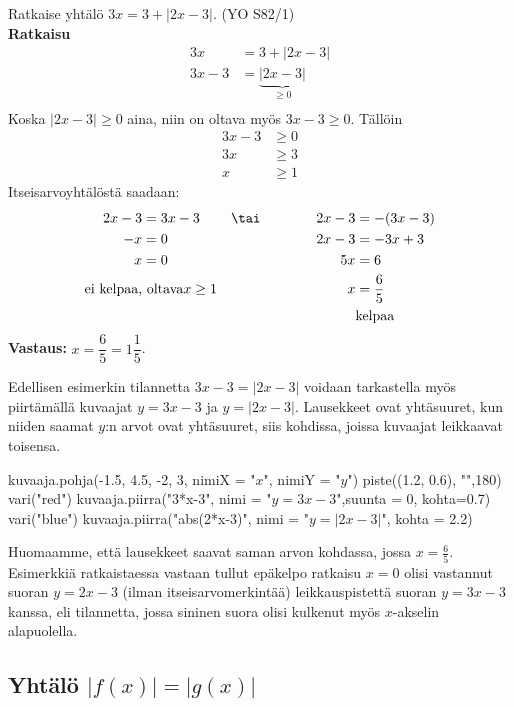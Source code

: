 \begin{esimerkki}
Ratkaise yhtälö $3x=3+|2x-3|$. (YO S82/1)\\
\textbf{Ratkaisu}\\
\begin{align*}
	3x&=3+|2x-3|  \\
	3x-3&=\underbrace{|2x-3|}_{\geq0}  \\
\end{align*}
Koska $|2x-3|\geq0$ aina, niin on oltava myös $3x-3\geq0$. Tällöin
\begin{align*}
	3x-3&\geq0 \\
	3x&\geq3 \\
	x&\geq1
\end{align*}
Itseisarvoyhtälöstä saadaan:
\begin{align*}
	2x-3&=3x-3   &\tai  \qquad \qquad 2x-3&=-(3x-3) \\
	-x&=0        &\ \                  2x-3&=-3x+3 \\
	x&=0         &\ \                  5x&=6 \\
	\text{ei kelpaa,}&\text{ oltava}x\geq1  &\ \  x&=\frac{6}{5} \\
	&\ \         &\ \                 &\text{kelpaa}
\end{align*}
\textbf{Vastaus: }$x=\dfrac{6}{5}=1\dfrac{1}{5}$.

\end{esimerkki}


Edellisen esimerkin tilannetta $3x-3=|2x-3|$ voidaan tarkastella myös piirtämällä kuvaajat $y=3x-3$ ja $y=|2x-3|$. Lausekkeet ovat yhtäsuuret, kun niiden saamat $y$:n arvot ovat yhtäsuuret, siis kohdissa, joissa kuvaajat leikkaavat toisensa.


\begin{kuva}
    kuvaaja.pohja(-1.5, 4.5, -2, 3, nimiX = "$x$", nimiY = "$y$")
    piste((1.2, 0.6), "",180)
    vari("red")
    kuvaaja.piirra("3*x-3", nimi = "$y=3x - 3$",suunta = 0, kohta=0.7)
    vari("blue")
    kuvaaja.piirra("abs(2*x-3)", nimi = "$y=|2x - 3|$", kohta = 2.2)
\end{kuva}

Huomaamme, että lausekkeet saavat saman arvon kohdassa, jossa \mbox{$x=\frac{6}{5}$}. Esimerkkiä ratkaistaessa vastaan tullut epäkelpo ratkaisu $x=0$ olisi vastannut suoran $y=2x-3$ (ilman itseisarvomerkintää) leikkauspistettä suoran $y=3x-3$ kanssa, eli tilannetta, jossa sininen suora olisi kulkenut myös $x$-akselin alapuolella.

\subsection*{Yhtälö $|f(x)|=|g(x)|$}


